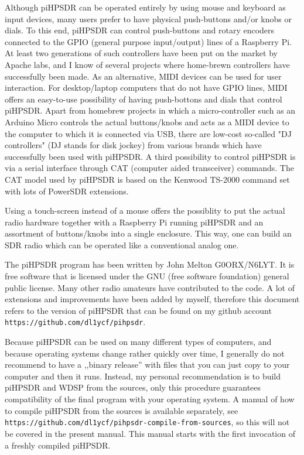 \documentclass[12pt]{book}
\begin{document}
Although piHPSDR can be operated entirely by using mouse and keyboard as input devices, many users prefer to
have physical push-buttons and/or knobs or dials. To this end, piHPSDR can control push-buttons and rotary
encoders connected to the GPIO (general purpose input/output)
lines of a Raspberry Pi. At least two generations of such controllers have
been put on the market by Apache labs, and I know of several projects where home-brewn controllers have
successfully been made. As an alternative, MIDI devices can be used for user interaction. For desktop/laptop
computers that do not have GPIO lines, MIDI offers an easy-to-use possibility of having push-bottons and
dials that control piHPSDR. Apart from homebrew projects in which a micro-controller such as an Arduino Micro
controls the actual buttons/knobs and acts as a MIDI device to the computer to which it is connected via USB,
there are low-cost so-called "DJ controllers" (DJ stands for disk jockey) from various brands which have
successfully been used with piHPSDR. A third possibility to control piHPSDR is via a serial interface
through CAT (computer aided transceiver) commands. The CAT model used by piHPSDR is based on the Kenwood
TS-2000 command set with lots of PowerSDR extensions.

Using a touch-screen instead of a mouse offers the possiblity to put the actual radio hardware together
with a Raspberry Pi running piHPSDR and an assortment of buttons/knobs into a single enclosure. This way,
one can build an SDR radio which can be operated like a conventional analog one.

The piHPSDR program has been written by John Melton G0ORX/N6LYT. It is free software that is licensed under
the GNU (free software foundation) general public license. Many other radio amateurs have contributed to
the code. A lot of extensions and improvements have been added by myself, therefore this document refers
to the version of piHPSDR that can be found on my github account \texttt{https://github.com/dl1ycf/pihpsdr}.

Because piHPSDR can be used on many different types of computers, and because operating systems change
rather quickly over time, I generally do not recommend to have a ,,binary release'' with files that you
can just copy to your computer and then it runs. Instead, my personal recommendation is to build piHPSDR
and WDSP from the sources, only this procedure guarantees compatibility of the final program with your
operating system. A manual of how to compile piHPSDR from the sources is available separately,
see \texttt{https://github.com/dl1ycf/pihpsdr-compile-from-sources}, so this will not be covered in 
the present manual. This manual starts with the first invocation of a freshly compiled piHPSDR.
\end{document}
